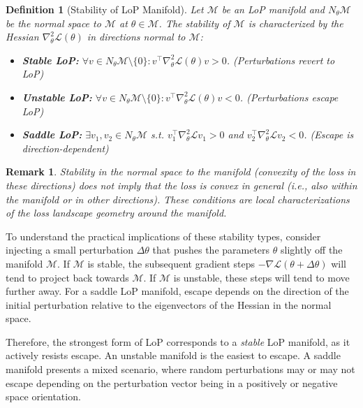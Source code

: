 \documentclass{article}
\newcommand{\Loss}{\mathcal{L}}
\newtheorem{definition}{Definition}[section]
\newtheorem{remark}{Remark}[section]
\numberwithin{figure}{section}
\begin{document}
\begin{definition}[Stability of LoP Manifold]
\label{def:lop_stability_main}
Let $\mathcal{M}$ be an LoP manifold and $N_\theta\mathcal{M}$ be the normal space to $\mathcal{M}$ at $\theta \in \mathcal{M}$. The stability of $\mathcal{M}$ is characterized by the Hessian $\nabla_\theta^2\Loss(\theta)$ in directions normal to $\mathcal{M}$:
\begin{itemize}
    \item \textbf{Stable LoP:} $\forall v\in N_\theta\mathcal{M}\setminus\{0\}: v^\top\nabla_\theta^2\Loss(\theta)v > 0$. (Perturbations revert to LoP)
    \item \textbf{Unstable LoP:} $\forall v\in N_\theta\mathcal{M}\setminus\{0\}: v^\top\nabla_\theta^2\Loss(\theta)v < 0$. (Perturbations  escape LoP)
    \item \textbf{Saddle LoP:} $\exists v_1,v_2\in N_\theta\mathcal{M}$ s.t. $v_1^\top\nabla_\theta^2\Loss v_1>0$ and $v_2^\top\nabla_\theta^2\Loss v_2<0$. (Escape is direction-dependent)
\end{itemize}
\end{definition}

\begin{remark}
Stability in the normal space to the manifold (convexity of the loss in these directions) does not imply that the loss is convex in general (i.e., also within the manifold or in other directions). These conditions are local characterizations of the loss landscape geometry around the manifold.
\end{remark}

To understand the practical implications of these stability types, consider injecting a small perturbation $\Delta\theta$ that pushes the parameters $\theta$ slightly off the manifold $\mathcal{M}$. If $\mathcal{M}$ is stable, the subsequent gradient steps $-\nabla \Loss(\theta+\Delta\theta)$ will tend to project back towards $\mathcal{M}$. If $\mathcal{M}$ is unstable, these steps will tend to move further away. For a saddle LoP manifold, escape depends on the direction of the initial perturbation relative to the eigenvectors of the Hessian in the normal space.

Therefore, the strongest form of LoP corresponds to a \emph{stable} LoP manifold, as it actively resists escape. An unstable manifold is the easiest to escape. A saddle manifold presents a mixed scenario, where random perturbations may or may not escape depending on the perturbation vector being in a positively or negative space orientation. 
\end{document}
